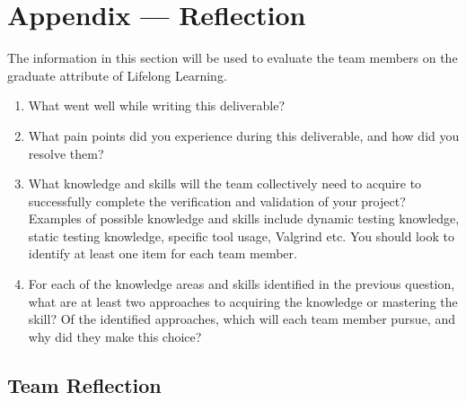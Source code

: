 \documentclass[12pt, titlepage]{article}
\begin{document}
\newpage{}
\section*{Appendix --- Reflection}


The information in this section will be used to evaluate the team members on the
graduate attribute of Lifelong Learning.



\begin{enumerate}
  \item What went well while writing this deliverable? 
  \item What pain points did you experience during this deliverable, and how
    did you resolve them?
  \item What knowledge and skills will the team collectively need to acquire to
  successfully complete the verification and validation of your project?
  Examples of possible knowledge and skills include dynamic testing knowledge,
  static testing knowledge, specific tool usage, Valgrind etc.  You should look to
  identify at least one item for each team member.
  \item For each of the knowledge areas and skills identified in the previous
  question, what are at least two approaches to acquiring the knowledge or
  mastering the skill?  Of the identified approaches, which will each team
  member pursue, and why did they make this choice?
\end{enumerate}

\subsection*{Team Reflection}
\end{document}
